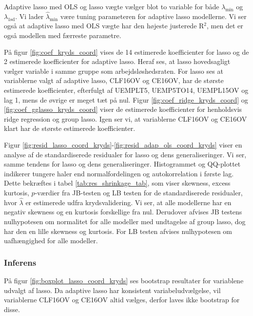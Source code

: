 Adaptive lasso med OLS og lasso vægte vælger blot to variable for både  $\lambda_{\min}$ og $\lambda_{1\text{sd}}$. 
Vi lader $\widehat{\lambda}_{\min}$ være tuning parameteren for adaptive lasso modellerne. Vi ser også at adaptive lasso med OLS vægte har den højeste justerede R$^2$, men det er også modellen med færreste parametre. 

På figur \ref{fig:coef_kryds_coord} vises de 14 estimerede koefficienter for lasso og de 2 estimerede koefficienter for adaptive lasso.
Heraf ses, at lasso hovedsagligt vælger variable i samme gruppe som arbejdsløshedsraten.
For lasso ses at variablerne valgt af adaptive lasso, \textcolor{blue3}{CLF16OV} og \textcolor{blue3}{CE16OV}, har de største estimerede koefficienter, efterfulgt af \textcolor{blue3}{UEMPLT5}, \textcolor{blue3}{UEMP5TO14}, \textcolor{blue3}{UEMPL15OV} og \textcolor{blue3}{lag 1}, mens de øvrige er meget tæt på nul. 
Figur \ref{fig:coef_ridge_kryds_coord} og \ref{fig:coef_gglasso_kryds_coord} viser de estimerede koefficienter for henholdsvis ridge regression og group lasso.
Igen ser vi, at variablerne \textcolor{blue3}{CLF16OV} og \textcolor{blue3}{CE16OV} klart har de største estimerede koefficienter.    
%


Figur \ref{fig:resid_lasso_coord_kryds}-\ref{fig:resid_adap_ols_coord_kryds} viser en analyse af de standardiserede residualer for lasso og dens generaliseringer. 
Vi ser, samme tendens for lasso og dens generaliseringer. Histogrammet og QQ-plottet indikerer tungere haler end normalfordelingen og autokorrelation i første lag.
Dette bekræftes i tabel \ref{tab:res_shrinkage_tab}, som viser skewness, excess kurtosis, $p$-værdier fra JB-testen og LB testen for de standardiserede residualer, hvor $\widehat{\lambda}$ er estimerede udfra krydsvalidering.  
Vi ser, at alle modellerne har en negativ skewness og en kurtosis forskellige fra nul. 
Derudover afvises JB testens nulhypotesen om normalitet for alle modeller med undtagelse af group lasso, dog har den en lille skewness og kurtosis.
For LB testen afvises nulhypotesen om uafhængighed for alle modeller.

\subsubsection{Inferens}
På figur \ref{fig:boxplot_lasso_coord_kryds} ses bootstrap resultater for variablene udvalgt af lasso.
Da adaptive lasso har konsistent variabeludvælgelse, vil variablerne \textcolor{blue3}{CLF16OV} og \textcolor{blue3}{CE16OV} altid vælges, derfor laves ikke bootstrap for disse.

